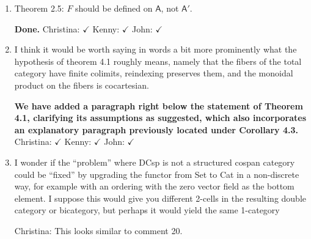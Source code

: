 \documentclass[reqno]{amsart}
\def\chris{\color{purple} Christina: }
\def\john{\color{red} John: }
\def\kenny{\color{blue} Kenny: }
\begin{document}
\begin{enumerate}
{}

{\chris Right! We can perhaps add a sentence to this end, saying that although we only use E as an identity, someone could need to change decorations 
for some application?}

{\kenny Sure, maybe sometime before the official statement of the Theorem when we're describing how the double functor $\mathbb{H}$ is defined?}

{\chris Sounds good to me!}

{\kenny I've added a long run-on sentence beneath the square on page 9 trying to say more about the functors $H$ and $E$ from an intuitive standpoint. Edit at will.}

\item Theorem 2.5: $F$ should be defined on $\mathsf{A}$, not $\mathsf{A}'$.

{\bf Done.} {\chris $\checkmark$} {\kenny $\checkmark$} {\john $\checkmark$}

\item I think it would be worth saying in words a bit more prominently what the hypothesis of theorem 4.1 roughly means, namely that the fibers of 
the total 
category have finite colimits, reindexing preserves them, and the monoidal product on the fibers is cocartesian.

{\bf We have added a paragraph right below the statement of Theorem 4.1, clarifying its assumptions as suggested, which also incorporates an 
explanatory paragraph previously located under Corollary 4.3.} {\chris $\checkmark$} {\kenny $\checkmark$} {\john $\checkmark$} 

\item I wonder if the “problem” where DCsp is not a structured cospan category could be “fixed” by upgrading the functor from Set to Cat in a 
non-discrete 
way, for example with an ordering with the zero vector field as the bottom element. I suppose this would give you different 2-cells in the resulting 
double category or bicategory, but perhaps it would yield the same 1-category

{\chris This looks similar to comment 20.}
\end{enumerate}
\end{document}
